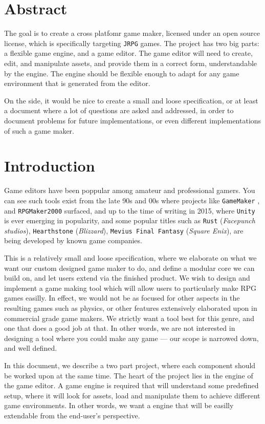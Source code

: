 \section{Abstract}

The goal is to create a cross platfomr game maker, licensed under an open source
license, which is specifically targeting \texttt{JRPG} games.  The project has
two big parts: a flexible game engine, and a game editor. The game editor will
need to create, edit, and manipulate assets, and provide them in a correct form,
understandable by the engine. The engine should be flexible enough to adapt for
any game environment that is generated from the editor.

On the side, it would be nice to create a small and loose specification, or at
least a document where a lot of questions are asked and addressed, in order to
document problems for future implementations, or even different implementations
of such a game maker.

\section{Introduction}

Game editors have been poppular among amateur and professional gamers. You can
see such tools exist from the late 90s and 00s where projects like
\texttt{GameMaker} \cite{gamemaker}, and \texttt{RPGMaker2000}
\cite{rpgmaker2000} surfaced, and up to the time of writing in 2015, where
\texttt{Unity} is ever emerging in popularity, and some popular titles such as
\texttt{Rust} (\textit{Facepunch studios}), \texttt{Hearthstone}
(\textit{Blizzard}), \texttt{Mevius Final Fantasy} (\textit{Square Enix}), are being
developed by known game companies.

This is a relatively small and loose specification, where we elaborate on what
we want our custom designed game maker to do, and define a modular core we can
build on, and let users extend via the finished product. We wish to design and
implement a game making tool which will allow users to particularly make RPG
games easilly. In effect, we would not be as focused for other aspects in the
resulting games such as physics, or other features extensively elaborated upon
in commercial grade game makers. We strictly want a tool best for this genre,
and one that does a good job at that. In other words, we are not interested in
designing a tool where you could make any game --- our scope is narrowed down,
and well defined.

In this document, we describe a two part project, where each component should be
worked upon at the same time. The heart of the project lies in the engine of the
game editor. A game engine is required that will understand some predefined
setup, where it will look for assets, load and manipulate them to achieve
different game environments. In other words, we want a engine that will be
easilly extendable from the end-user's perspective.

